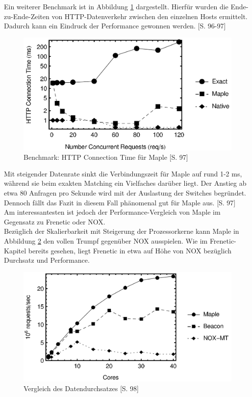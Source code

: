 \documentclass[10pt,conference]{IEEEtran}
\begin{document}
Ein weiterer Benchmark ist in Abbildung \ref{fig:mapleConnectionTime} dargestellt. Hierfür wurden die Ende-zu-Ende-Zeiten von HTTP-Datenverkehr zwischen den einzelnen Hosts ermittelt. Dadurch kann ein Eindruck der Performance gewonnen werden. \cite{7}[S. 96-97]
\begin{figure}[h]
	\centering
	\includegraphics[width=\columnwidth]{images/mapleConnectionTime.PNG}
	\caption{Benchmark: HTTP Connection Time für Maple \cite{7}[S. 97]}
	\label{fig:mapleConnectionTime}
\end{figure}
\newline
Mit steigender Datenrate sinkt die Verbindungszeit für Maple auf rund 1-2 ms, während sie beim exakten Matching ein Vielfaches darüber liegt. Der Anstieg ab etwa 80 Anfragen pro Sekunde wird mit der Auslastung der Switches begründet.\\
Dennoch fällt das Fazit in diesem Fall phänomenal gut für Maple aus. \cite{7}[S. 97]\\
\newline
Am interessantesten ist jedoch der Performance-Vergleich von Maple im Gegensatz zu Frenetic oder NOX.\\
Bezüglich der Skalierbarkeit mit Steigerung der Prozessorkerne kann Maple in Abbildung \ref{fig:mapleDurchsatz} den vollen Trumpf gegenüber NOX ausspielen. Wie im Frenetic-Kapitel bereits gesehen, liegt Frenetic in etwa auf Höhe von NOX bezüglich Durchsatz und Performance.
\begin{figure}[h]
	\centering
	\includegraphics[width=\columnwidth]{images/mapleDurchsatz.PNG}
	\caption{Vergleich des Datendurchsatzes \cite{7}[S. 98]}
	\label{fig:mapleDurchsatz}
\end{figure}
\end{document}
